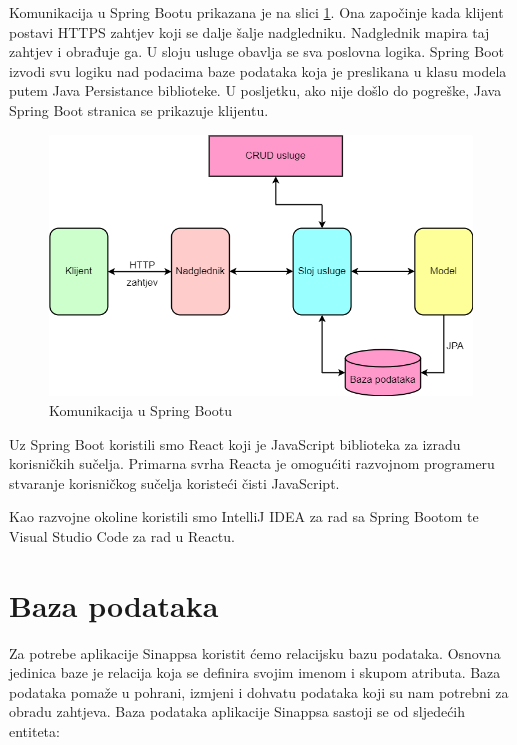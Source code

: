 	\eject
	
		Komunikacija u Spring Bootu prikazana je na slici \ref{fig:flow}. Ona započinje kada klijent postavi HTTPS zahtjev koji se dalje šalje nadgledniku. Nadglednik mapira taj zahtjev i obrađuje ga. U sloju usluge obavlja se sva poslovna logika. Spring Boot izvodi svu logiku nad podacima baze podataka koja je preslikana u klasu modela putem Java Persistance biblioteke. U posljetku, ako nije došlo do pogreške, Java Spring Boot stranica se prikazuje klijentu.
				
		\begin{figure}[H]
			\includegraphics[scale=0.57]{slike/flow.png}
			\centering
			\caption{Komunikacija u Spring Bootu}
			\label{fig:flow}
		\end{figure}
	
		Uz Spring Boot koristili smo React koji je JavaScript biblioteka za izradu korisničkih sučelja. Primarna svrha Reacta je omogućiti razvojnom programeru stvaranje korisničkog sučelja koristeći čisti JavaScript.
		
		Kao razvojne okoline koristili smo IntelliJ IDEA za rad sa Spring Bootom te Visual Studio Code za rad u Reactu. 
		
				
	\eject
	
		\section{Baza podataka}
		
			Za potrebe aplikacije Sinappsa koristit ćemo relacijsku bazu podataka. Osnovna jedinica baze je relacija koja se definira svojim imenom i skupom atributa. Baza podataka pomaže u pohrani, izmjeni i dohvatu podataka koji su nam potrebni za obradu zahtjeva. Baza podataka aplikacije Sinappsa sastoji se od sljedećih entiteta:
			
